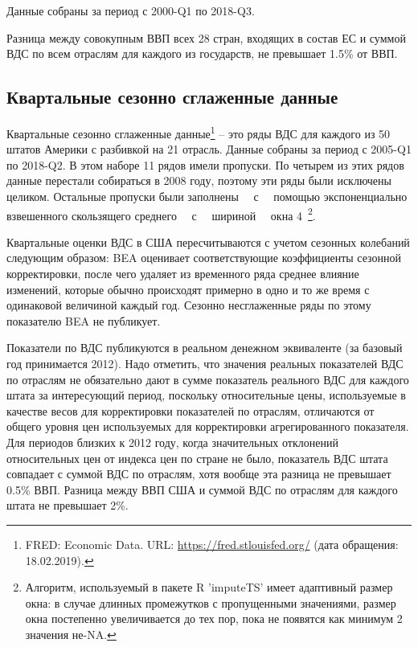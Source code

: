 \documentclass[12pt,a4paper, oneside]{extreport}
\begin{document}
Данные собраны за период с 2000-Q1 по 2018-Q3. 




Разница между совокупным ВВП всех 28 стран, входящих в состав ЕС  и суммой ВДС по всем отраслям для каждого из государств, не превышает  1.5\% от ВВП. 

\subsection{Квартальные сезонно сглаженные данные}

Квартальные сезонно сглаженные данные\footnote{FRED: Economic Data. URL: \url{https://fred.stlouisfed.org/} (дата обращения: 18.02.2019).} -- это ряды ВДС  для каждого из 50 штатов Америки с разбивкой на 21 отрасль.  Данные собраны за период с 2005-Q1 по 2018-Q2. 
В этом наборе 11 рядов имели пропуски. По четырем из этих рядов  данные перестали собираться в 2008 году, поэтому эти ряды были исключены целиком. Остальные пропуски  были заполнены \ \ с \ \ помощью экспоненциально взвешенного скользящего среднего \ \  с \ \  шириной \  \  окна 4~\footnote{Алгоритм, используемый в пакете R 'imputeTS'   имеет адаптивный размер окна: в случае длинных промежутков с пропущенными значениями, размер окна постепенно увеличивается до тех пор, пока не появятся как минимум 2 значения не-NA. }. 

Квартальные оценки ВДС в США пересчитываются с учетом сезонных колебаний следующим образом: BEA оценивает соответствующие коэффициенты сезонной корректировки, после чего удаляет из временного ряда среднее влияние изменений, которые обычно происходят примерно в одно и то же время  с одинаковой величиной каждый год. Сезонно несглаженные ряды по этому показателю BEA не публикует.

Показатели по ВДС публикуются в реальном денежном эквиваленте (за базовый год принимается 2012).
Надо отметить, что  значения реальных показателей ВДС по отраслям не обязательно дают в сумме показатель реального ВДС для каждого штата за интересующий период, поскольку относительные цены, используемые в качестве весов для корректировки показателей по отраслям, отличаются от общего уровня цен используемых для корректировки агрегированного показателя. 
Для периодов близких к 2012 году, когда значительных отклонений относительных цен от индекса цен по стране не было, показатель ВДС штата совпадает с суммой ВДС по отраслям, хотя  вообще эта разница не превышает 0.5\% ВВП.
Разница между ВВП США и суммой ВДС по отраслям для каждого штата не превышает 2\%. 
\end{document}
